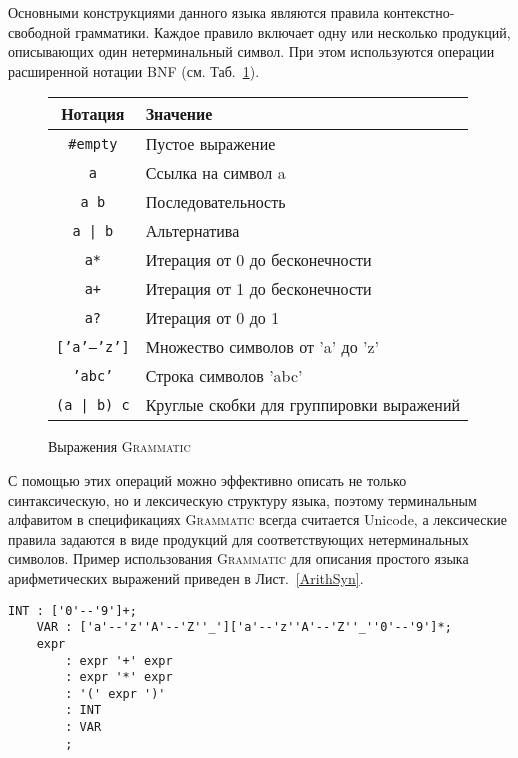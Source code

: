 \documentclass[12pt,a4paper]{article}
\newcommand{\lstref}[1]{Лист.~\ref{#1}}
\newcommand{\tabref}[1]{Таб.~\ref{#1}}
\newcommand{\code}[1]{\mbox{\texttt{#1}}}
\newcommand{\tool}[1]{\textsc{#1}}
\theoremstyle{definition}
\theoremstyle{plain}
\newcommand{\GRM}{\tool{Grammatic}}
\begin{document}
Основными конструкциями данного языка являются правила контекстно-свободной грамматики. Каждое правило включает одну или несколько продукций, описывающих один нетерминальный символ. При этом используются операции расширенной нотации BNF (см. \tabref{operations}). 
\begin{figure}[htbp]
\center
	\begin{tabular}{|c|l|}
	\hline
	\bf Нотация & \bf Значение \\
	\hline
	\code{\#empty} & Пустое выражение \\
	\code{a} & Ссылка на символ a \\
	\code{a b} & Последовательность \\
	\code{a | b} & Альтернатива \\
	\code{a*} & Итерация от 0 до бесконечности \\
	\code{a+} & Итерация от 1 до бесконечности \\
	\code{a?} & Итерация от 0 до 1 \\
	\code{['a'--'z']} & Множество символов от 'a' до 'z' \\
	\code{'abc'} & Строка символов 'abc' \\
	\code{(a | b) c} & Круглые скобки для группировки выражений \\
	\hline
	\end{tabular}
	\caption{Выражения \GRM{}}\label{operations}
\end{figure}
С помощью этих операций можно эффективно описать не только синтаксическую, но и лексическую структуру языка, поэтому терминальным алфавитом в спецификациях \GRM{} всегда считается Unicode, а лексические правила задаются в виде продукций для соответствующих нетерминальных символов. Пример использования \GRM{} для описания простого языка арифметических выражений приведен в \lstref{ArithSyn}.
\begin{lstlisting}[float=htbp,label=ArithSyn,caption=Грамматика языка арифметических выражений]
	INT : ['0'--'9']+;
	VAR : ['a'--'z''A'--'Z''_']['a'--'z''A'--'Z''_''0'--'9']*;
	expr
		: expr '+' expr
		: expr '*' expr
		: '(' expr ')'
		: INT
		: VAR
		;
\end{lstlisting}
\end{document}
